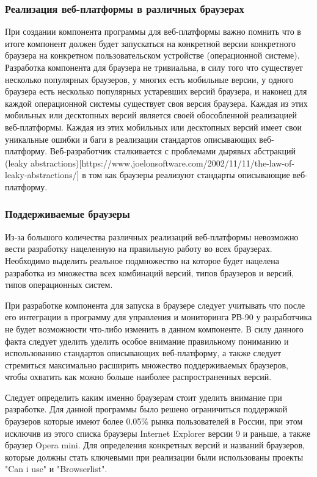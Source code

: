 \subsubsection{ Реализация веб-платформы в различных браузерах}
При создании компонента программы для веб-платформы важно помнить что в итоге компонент должен будет запускаться на конкретной версии конкретного браузера на конкретном пользовательском устройстве (операционной системе).
Разработка компонента для браузера не тривиальна, в силу того что существует несколько популярных браузеров, у многих есть мобильные версии, у одного браузера есть несколько популярных устаревших версий браузера, и наконец для каждой операционной системы существует своя версия браузера. Каждая из этих мобильных или десктопных версий является своей обособленной реализацией веб-платформы. Каждая из этих мобильных или десктопных версий имеет свои уникальные ошибки и баги в реализации стандартов описывающих веб-платформу. Веб-разработчик сталкивается с проблемами дырявых абстракций (leaky abstractions)[https://www.joelonsoftware.com/2002/11/11/the-law-of-leaky-abstractions/] в том как браузеры реализуют стандарты описывающие веб-платформу.


\subsubsection{ Поддерживаемые браузеры}
Из-за большого количества различных реализаций веб-платформы невозможно вести разработку нацеленную на правильную работу во всех браузерах. Необходимо выделить реальное подмножество на которое будет нацелена разработка из множества всех комбинаций версий, типов браузеров и версий, типов операционных систем.

При разработке компонента для запуска в браузере следует учитывать что после его интеграции в программу для управления и мониторинга РВ-90 у разработчика не будет возможности что-либо изменить в данном компоненте. В силу данного факта следует уделить уделить особое внимание правильному пониманию и использованию стандартов описывающих веб-платформу, а также следует стремиться максимально расширить множество поддерживаемых браузеров, чтобы охватить как можно больше наиболее распространенных версий.

Следует определить каким именно браузерам стоит уделить внимание при разработке. 
Для данной программы было решено ограничиться поддержкой браузеров которые имеют более 0.05\% рынка пользователей в России, при этом исключив из этого списка браузеры Internet Explorer версии 9 и раньше, а также браузер Opera mini. Для определения конкретных версий и названий браузеров, которые должны стать ключевыми при реализации были использованы проекты "Can i use" и "Browserlist".

